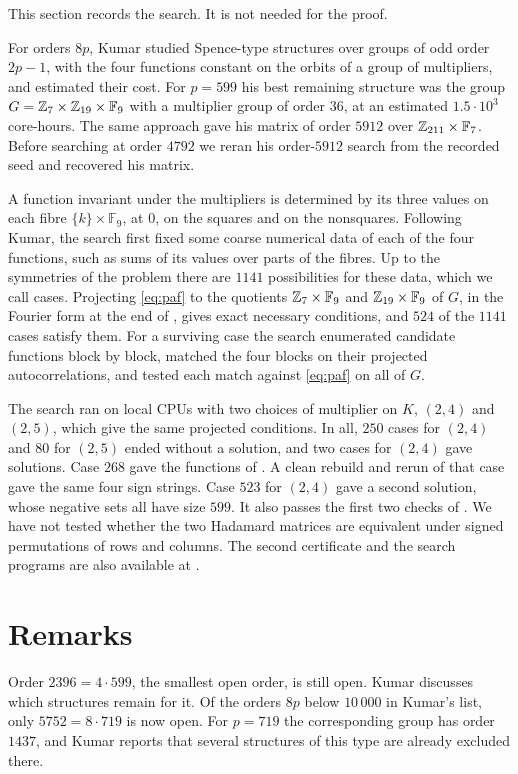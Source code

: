 \documentclass[11pt,colorlinks]{charlie}
\newcommand{\F}{\mathbb{F}}
\begin{document}
This section records the search. It is not needed for the proof.

For orders $8p$, Kumar \cite{Kumar} studied Spence-type structures over groups of odd order $2p-1$, with the four functions constant on the orbits of a group of multipliers, and estimated their cost. For $p=599$ his best remaining structure was the group $G=\Z_7\times\Z_{19}\times\F_9$ with a multiplier group of order $36$, at an estimated $1.5\cdot10^3$ core-hours. The same approach gave his matrix of order $5912$ over $\Z_{211}\times\F_7$. Before searching at order $4792$ we reran his order-$5912$ search from the recorded seed and recovered his matrix.

A function invariant under the multipliers is determined by its three values on each fibre $\{k\}\times\F_9$, at $0$, on the squares and on the nonsquares. Following Kumar, the search first fixed some coarse numerical data of each of the four functions, such as sums of its values over parts of the fibres. Up to the symmetries of the problem there are $1141$ possibilities for these data, which we call cases. Projecting \eqref{eq:paf} to the quotients $\Z_7\times\F_9$ and $\Z_{19}\times\F_9$ of $G$, in the Fourier form at the end of , gives exact necessary conditions, and $524$ of the $1141$ cases satisfy them. For a surviving case the search enumerated candidate functions block by block, matched the four blocks on their projected autocorrelations, and tested each match against \eqref{eq:paf} on all of $G$.

The search ran on local CPUs with two choices of multiplier on $K$, $(2,4)$ and $(2,5)$, which give the same projected conditions. In all, $250$ cases for $(2,4)$ and $80$ for $(2,5)$ ended without a solution, and two cases for $(2,4)$ gave solutions. Case $268$ gave the functions of . A clean rebuild and rerun of that case gave the same four sign strings. Case $523$ for $(2,4)$ gave a second solution, whose negative sets all have size $599$. It also passes the first two checks of . We have not tested whether the two Hadamard matrices are equivalent under signed permutations of rows and columns. The second certificate and the search programs are also available at \coderepo.

\section{Remarks}\label{sec:remarks}

Order $2396=4\cdot599$, the smallest open order, is still open. Kumar \cite{Kumar} discusses which structures remain for it. Of the orders $8p$ below $10\,000$ in Kumar's list, only $5752=8\cdot719$ is now open. For $p=719$ the corresponding group has order $1437$, and Kumar reports that several structures of this type are already excluded there.
\end{document}
